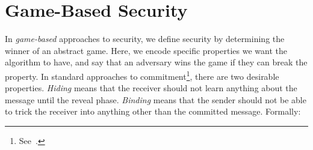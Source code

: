 \section{Game-Based Security}

In \emph{game-based} approaches to security, we define security by determining
the winner of an abstract game. Here, we encode specific properties we want the
algorithm to have, and say that an adversary wins the game if they can break the
property. In standard approaches to
commitment\footnote{See~\cites[Section 4.4.1]{goldreich-2001}.}, there are two
desirable properties. \emph{Hiding} means that the receiver should not learn
anything about the message until the reveal phase. \emph{Binding} means that the
sender should not be able to trick the receiver into anything other than the
committed message. Formally:

